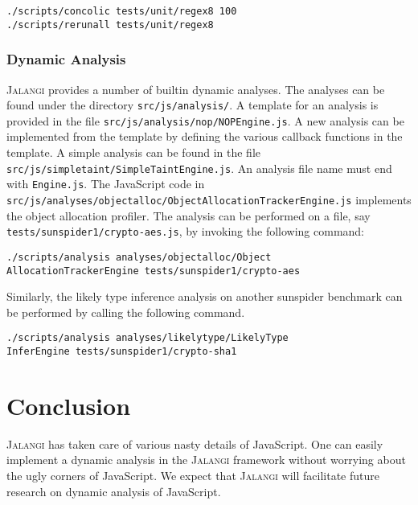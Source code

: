 \documentclass{sig-alternate}
\def\jalangi{\textsc{Jalangi}}
\begin{document}
\begin{verbatim}
./scripts/concolic tests/unit/regex8 100
./scripts/rerunall tests/unit/regex8
\end{verbatim}

\subsubsection*{Dynamic Analysis}
\label{sec:dynamic-analysis}

\jalangi{} provides a number of builtin dynamic analyses.  The
analyses can be found under the directory \texttt{src/js/analysis/}.
A template for an analysis is provided in the file
\texttt{src/js/analysis/nop/NOPEngine.js}.  A new analysis can be
implemented from the template by defining the various callback
functions in the template.  A simple analysis can be found in the file
\texttt{src/js/simpletaint/SimpleTaintEngine.js}.  An analysis file
name must end with \texttt{Engine.js}.  The JavaScript code in
\texttt{src/js/analyses/objectalloc/ObjectAllocationTrackerEngine.js}
implements the object allocation profiler. The analysis can be
performed on a file, say \texttt{tests/sunspider1/crypto-aes.js}, by
invoking the following command:

\begin{verbatim}
./scripts/analysis analyses/objectalloc/Object
AllocationTrackerEngine tests/sunspider1/crypto-aes
\end{verbatim}

Similarly, the likely type inference analysis on another sunspider
benchmark can be performed by calling the following command.

\begin{verbatim}
./scripts/analysis analyses/likelytype/LikelyType
InferEngine tests/sunspider1/crypto-sha1
\end{verbatim}


\section{Conclusion}
\label{sec:conclusion}

\jalangi{} has taken care of various nasty details of JavaScript.  One
can easily implement a dynamic analysis in the \jalangi{} framework
without worrying about the ugly corners of JavaScript.  We expect that
\jalangi{} will facilitate future research on dynamic analysis of
JavaScript. 

\end{document}
